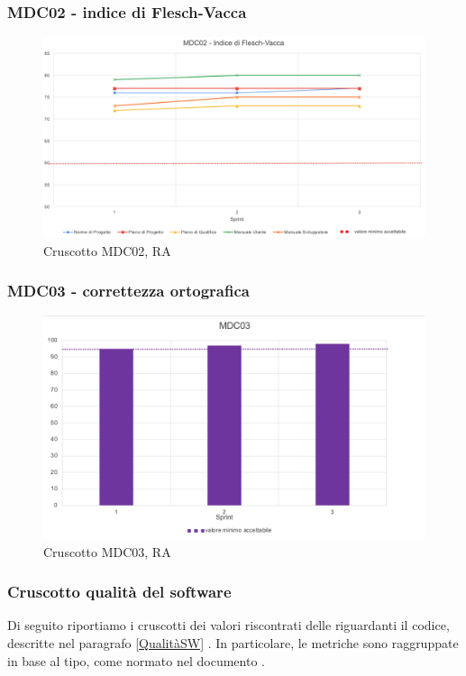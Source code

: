 \subsubsection*{MDC02 - indice di Flesch-Vacca}

\begin{figure}[H] 
    \centering
    \includegraphics[scale = 0.6]{immagini/ImmRA/MDC02.png}
    \caption{Cruscotto MDC02, RA}
\end{figure}

\subsubsection*{MDC03 - correttezza ortografica}

\begin{figure}[H] 
    \centering
    \includegraphics[scale = 0.8]{immagini/ImmRA/MDC03.png}
    \caption{Cruscotto MDC03, RA}
\end{figure}
\subsubsection{Cruscotto qualità del software}
Di seguito riportiamo i cruscotti dei valori riscontrati delle  riguardanti il codice, descritte nel paragrafo \ref{QualitàSW} . In particolare, le metriche sono raggruppate in base al tipo, come normato nel documento \NdP{}.
